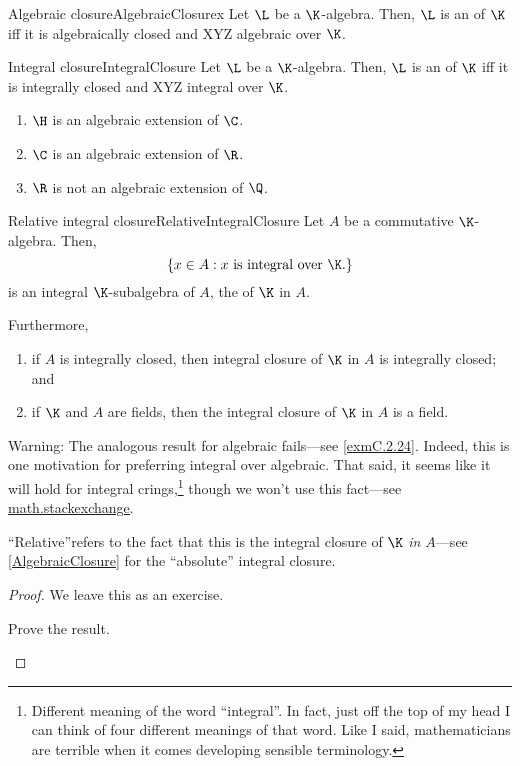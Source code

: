 \begin{mdf}{Algebraic closure}{AlgebraicClosurex}
	Let $\L$ be a $\K$-algebra.  Then, $\L$ is an  of $\K$ iff it is algebraically closed and XYZ algebraic over $\K$.
\end{mdf}
\begin{mdf}{Integral closure}{IntegralClosure}
	Let $\L$ be a $\K$-algebra.  Then, $\L$ is an  of $\K$ iff it is integrally closed and XYZ integral over $\K$.
\end{mdf}
\begin{exm}{}{}
	\begin{enumerate}
		\item $\H$ is an algebraic extension of $\C$.
		\item $\C$ is an algebraic extension of $\R$.
		\item $\R$ is not an algebraic extension of $\Q$.
	\end{enumerate}
\end{exm}
\begin{prp}{Relative integral closure}{RelativeIntegralClosure}
	Let $A$ be a commutative $\K$-algebra.  Then,
	\begin{equation}
		\left\{ x\in A:x\text{ is integral over }\K \text{.}\right\}
	\end{equation}
	is an integral $\K$-subalgebra of $A$, the  of $\K$ in $A$.
	
	Furthermore,
	\begin{enumerate}
		\item if $A$ is integrally closed, then integral closure of $\K$ in $A$ is integrally closed; and
		\item if $\K$ and $A$ are fields, then the integral closure of $\K$ in $A$ is a field.
	\end{enumerate}
	\begin{rmk}
		Warning:  The analogous result for algebraic fails---see \cref{exmC.2.24}.  Indeed, this is one motivation for preferring integral over algebraic.  That said, it seems like it will hold for integral crings,\footnote{Different meaning of the word ``integral''.  In fact, just off the top of my head I can think of four different meanings of that word.  Like I said, mathematicians are terrible when it comes developing sensible terminology.} though we won't use this fact---see \href{https://math.stackexchange.com/questions/759345/algebraic-vs-integral closure-of-a-ring?rq=1}{math.stackexchange}.
	\end{rmk}
	\begin{rmk}
		``Relative''refers to the fact that this is the integral closure of $\K$ \emph{in $A$}---see \cref{AlgebraicClosure} for the ``absolute'' integral closure.  
	\end{rmk}
	\begin{proof}
		We leave this as an exercise.
		\begin{exr}[breakable=false]{}{}
			Prove the result.
		\end{exr}
	\end{proof}
\end{prp}

